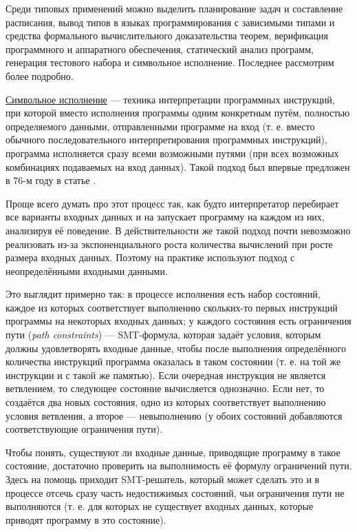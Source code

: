 Среди типовых применений можно выделить планирование задач и составление расписания, вывод типов в языках программирования с зависимыми типами и средства формального вычислительного доказательства теорем, верификация программного и аппаратного обеспечения, статический анализ программ, генерация тестового набора и символьное исполнение. Последнее рассмотрим более подробно.


\underline{Символьное исполнение} --- техника интерпретации программных инструкций, при которой вместо исполнения программы одним конкретным путём, полностью определяемого данными, отправленными программе на вход (т. е. вместо обычного последовательного интерпретирования программных инструкций), программа исполняется сразу всеми возможными путями (при всех возможных комбинациях подаваемых на вход данных). Такой подход был впервые предложен в 76-м году в статье \cite{symbex-intro-paper}.

Проще всего думать про этот процесс так, как будто интерпретатор перебирает все варианты входных данных и на запускает программу на каждом из них, анализируя её поведение. В действительности же такой подход почти невозможно реализовать из-за экспоненциального роста количества вычислений при росте размера входных данных. Поэтому на практике используют подход с неопределёнными входными данными.

Это выглядит примерно так: в процессе исполнения есть набор состояний, каждое из которых соответствует выполнению скольких-то первых инструкций программы на некоторых входных данных; у каждого состояния есть ограничения пути (\textit{path constraints}) --- SMT-формула, которая задаёт условия, которым должны удовлетворять входные данные, чтобы после выполнения определённого количества инструкций программа оказалась в таком состоянии (т. е. на той же инструкции и с такой же памятью). Если очередная инструкция не является ветвлением, то следующее состояние вычисляется однозначно. Если нет, то создаётся два новых состояния, одно из которых соответствует выполнению условия ветвления, а второе --- невыполнению (у обоих состояний добавляются соответствующие ограничения пути).

Чтобы понять, существуют ли входные данные, приводящие программу в такое состояние, достаточно проверить на выполнимость её формулу ограничений пути. Здесь на помощь приходит SMT-решатель, который может сделать это и в процессе отсечь сразу часть недостижимых состояний, чьи ограничения пути не выполняются (т. е. для которых не существует входных данных, которые приводят программу в это состояние).

